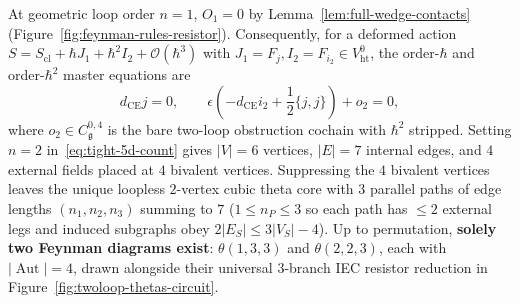 \documentclass[11pt,letterpaper]{article}
\numberwithin{equation}{section}
\theoremstyle{plain}
\theoremstyle{definition}
\theoremstyle{remark}
\newcommand{\fg}{\mathfrak{g}}
\newcommand{\Aut}{\operatorname{Aut}}
\newcommand{\Vht}{V_{\mathrm{ht}}}
\begin{document}
At geometric loop order $n = 1$, $O_1 = 0$ by Lemma~\ref{lem:full-wedge-contacts} (Figure~\ref{fig:feynman-rules-resistor}). Consequently, for a deformed action $S = S_{\mathrm{cl}} + \hbar J_1 + \hbar^2 I_2 + \mathcal{O}(\hbar^3)$ with $J_1 = F_j, I_2 = F_{i_2} \in \Vht^0$, the order-$\hbar$ and order-$\hbar^2$ master equations are
\begin{equation}
\label{eq:qme-1-2}
d_{\mathrm{CE}} j = 0, \qquad \epsilon\!\left(-d_{\mathrm{CE}} i_2 + \frac{1}{2}\{j, j\}\right) + o_2 = 0,
\end{equation}
where $o_2 \in C^{0,4}_{\fg}$ is the bare two-loop obstruction cochain with $\hbar^2$ stripped. Setting $n = 2$ in~\eqref{eq:tight-5d-count} gives $|V| = 6$ vertices, $|E| = 7$ internal edges, and $4$ external fields placed at $4$ bivalent vertices. Suppressing the $4$ bivalent vertices leaves the unique loopless $2$-vertex cubic theta core with $3$ parallel paths of edge lengths $(n_1,n_2,n_3)$ summing to $7$ ($1 \le n_P \le 3$ so each path has $\le 2$ external legs and induced subgraphs obey $2|E_S|\le 3|V_S|-4$). Up to permutation, \textbf{solely two Feynman diagrams exist}: $\theta(1,3,3)$ and $\theta(2,2,3)$, each with $|\Aut| = 4$, drawn alongside their universal $3$-branch IEC resistor reduction in Figure~\ref{fig:twoloop-thetas-circuit}.
\end{document}
